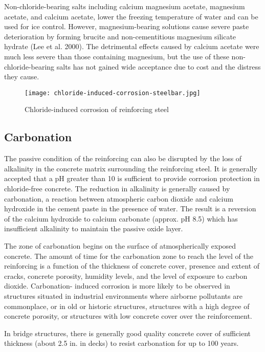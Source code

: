 Non-chloride-bearing salts including calcium magnesium acetate, magnesium acetate, and calcium acetate, lower the freezing temperature of water and can be used for ice control.  However, magnesium-bearing solutions cause severe paste deterioration by forming brucite and non-cementitious magnesium silicate hydrate (Lee et al. 2000).  The detrimental effects caused by calcium acetate were much less severe than those containing magnesium, but the use of these non-chloride-bearing salts has not gained wide acceptance due to cost and the distress they cause.

\begin{figure}
  \texttt{[image: chloride-induced-corrosion-steelbar.jpg]}
  \caption{Chloride-induced corrosion of reinforcing steel}
  \label{fig:chloride-induced-corrosion-steelbar}
\end{figure}
\subsection{Carbonation}
The passive condition of the reinforcing can also be disrupted by the loss of alkalinity in the concrete matrix surrounding the reinforcing steel. It is generally accepted that a pH greater than 10 is sufficient to provide corrosion protection in chloride-free concrete. The reduction in alkalinity is generally caused by carbonation, a reaction between atmospheric carbon dioxide and calcium hydroxide in the cement paste in the presence of water. The result is a reversion of the calcium hydroxide to calcium carbonate (approx. pH 8.5) which has insufficient alkalinity to maintain the passive oxide layer.

The zone of carbonation begins on the surface of atmospherically exposed concrete. The amount of time for the carbonation zone to reach the level of the reinforcing is a function of the thickness of concrete cover, presence and extent of cracks, concrete porosity, humidity levels, and the level of exposure to carbon dioxide.  Carbonation- induced corrosion is more likely to be observed in structures situated in industrial environments where airborne pollutants are commonplace, or in old or historic structures, structures with a high degree of concrete porosity, or structures with low concrete cover over the reinforcement.

In bridge structures, there is generally good quality concrete cover of sufficient thickness (about 2.5 in. in decks) to resist carbonation for up to 100 years.

